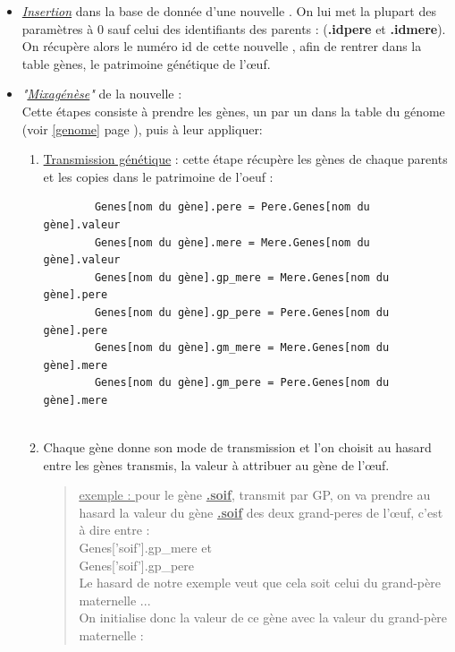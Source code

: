 \documentclass[french]{report}
\newlength{\du}\fi
\begin{document}
\begin{itemize}
	\item \textit{\underline{Insertion}} dans la base de donnée  d'une nouvelle \CoCiX. On lui met la plupart des paramètres à 0 sauf celui des identifiants des parents : (\textbf{.idpere} et \textbf{.idmere}). On récupère alors le numéro id de cette nouvelle \CoCiX, afin de rentrer dans la table gènes, le patrimoine génétique de l’œuf.\\
	
	\item \textit{"\underline{Mixagénèse}"} de la nouvelle \CoCiX : \\
	Cette étapes consiste à prendre les gènes, un par un dans la table du génome (voir \ref{genome} page \pageref{genome}), puis à leur appliquer: \\ 
	
	\begin{enumerate}
		
		\item \underline{Transmission génétique} : cette étape récupère les gènes de chaque parents et les copies dans le patrimoine de l'oeuf : \\
		\begin{verbatim}
		Genes[nom du gène].pere = Pere.Genes[nom du gène].valeur
		Genes[nom du gène].mere = Mere.Genes[nom du gène].valeur
		Genes[nom du gène].gp_mere = Mere.Genes[nom du gène].pere
		Genes[nom du gène].gp_pere = Pere.Genes[nom du gène].pere
		Genes[nom du gène].gm_mere = Mere.Genes[nom du gène].mere
		Genes[nom du gène].gm_pere = Pere.Genes[nom du gène].mere
		
		\end{verbatim}
		
		\item Chaque gène donne son mode de transmission et l'on choisit au hasard entre les gènes transmis, la valeur à attribuer au gène de l’œuf.\\
		
		\begin{quote}
			\underline{exemple : }
			pour le gène \underline{\textbf{.soif}}, transmit par GP, on va prendre au hasard la valeur du gène \underline{\textbf{.soif}} des deux grand-peres de l’œuf, c'est à dire entre : \\
			Genes['soif'].gp\_mere et\\
			Genes['soif'].gp\_pere\\
			
			Le hasard de notre exemple veut que cela soit celui du grand-père maternelle ...\\
			On initialise donc la valeur de ce gène avec la valeur du grand-père maternelle : \\
			

\end{quote}
\end{enumerate}
\end{itemize}
\end{document}
